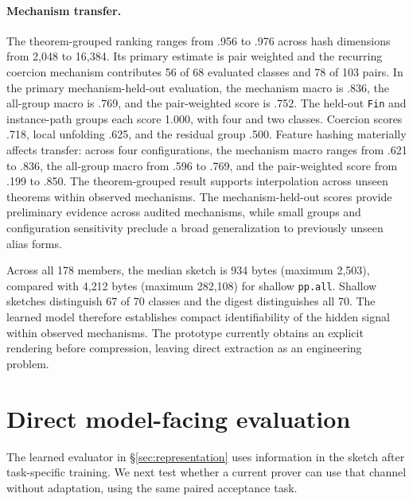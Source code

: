 \documentclass[11pt]{article}
\begin{document}
\paragraph{Mechanism transfer.}
The theorem-grouped ranking ranges from .956 to .976 across hash dimensions
from 2{,}048 to 16{,}384. Its primary estimate is pair weighted and the
recurring coercion mechanism contributes 56 of 68 evaluated classes and 78 of
103 pairs. In the primary mechanism-held-out evaluation, the mechanism macro is
.836, the all-group macro is .769, and the pair-weighted score is .752. The
held-out \texttt{Fin} and instance-path groups each score 1.000, with four and
two classes. Coercion scores .718, local unfolding .625, and the residual group
.500. Feature hashing materially affects transfer: across four configurations,
the mechanism macro ranges from .621 to .836, the all-group macro from .596 to
.769, and the pair-weighted score from .199 to .850. The theorem-grouped result
supports interpolation across unseen theorems within observed mechanisms. The
mechanism-held-out scores provide preliminary evidence across audited
mechanisms, while small groups and configuration sensitivity preclude a broad
generalization to previously unseen alias forms.

Across all 178 members, the median sketch is 934 bytes (maximum 2{,}503),
compared with 4{,}212 bytes (maximum 282{,}108) for shallow \texttt{pp.all}.
Shallow sketches distinguish 67 of 70 classes and the digest distinguishes all
70. The learned model therefore establishes compact identifiability of the
hidden signal within observed mechanisms. The prototype currently obtains an
explicit rendering before compression, leaving direct extraction as an
engineering problem.

\section{Direct model-facing evaluation}
\label{sec:utility}

The learned evaluator in \S\ref{sec:representation} uses information in the
sketch after task-specific training. We next test whether a current prover can
use that channel without adaptation, using the same paired acceptance task.
\end{document}
